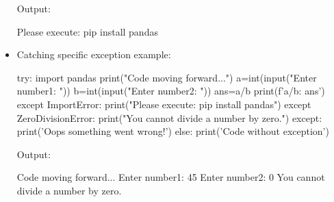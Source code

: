 \begin{flushleft}
\begin{itemize}
		Output:
		\begin{tcolorbox}[breakable,notitle,boxrule=-0pt,colback=error,colframe=error]
			\color{black}
			Please execute:  \newline
			pip install pandas
			\font=4pt
		\end{tcolorbox}		
	
		\newpage
		
		\item Catching specific exception example:
		\begin{tcolorbox}[breakable,notitle,boxrule=-0pt,colback=code,colframe=code]
			\color{white}
			\font=8pt
			try: \newline
			\hphantom{} \hphantom{} import pandas \newline
			\hphantom{} \hphantom{} print("Code moving forward...") \newline
		    \hphantom{} \hphantom{} a=int(input("Enter number1: ")) \newline
			\hphantom{} \hphantom{} b=int(input("Enter number2: ")) \newline
			\hphantom{} \hphantom{} ans=a/b \newline
			\hphantom{} \hphantom{} print(f'{a}/{b}: {ans}') \newline
			except ImportError: \newline
			\hphantom{} \hphantom{} print("Please execute: pip install pandas") \newline
			except ZeroDivisionError: \newline
			\hphantom{} \hphantom{} print("You cannot divide a number by zero.") \newline
			except: \newline
			\hphantom{} \hphantom{} print('Oops something went wrong!') \newline
			else: \newline
			\hphantom{} \hphantom{} print('Code without exception')
			\font=4pt
		\end{tcolorbox}
		
		Output: 
		\begin{tcolorbox}[breakable,notitle,boxrule=-0pt,colback=error,colframe=error]
			\color{black}
			Code moving forward...
			Enter number1: 45
			Enter number2: 0
			You cannot divide a number by zero.
			\font=4pt
		\end{tcolorbox}		
	
		\newpage


\end{itemize}
\end{flushleft}
